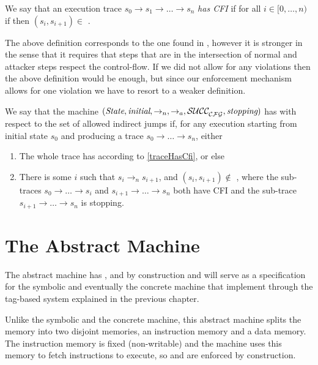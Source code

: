 \begin{definition}\label{traceHasCfi}
  We say that an execution trace $s_0 \to s_1 \to \ldots \to s_n$ {\em has CFI}
  if for all $ i \in [0,\ldots,n)$ if  then
  $(s_i,s_{i+1}) \in$ \SUCC .
\end{definition}


The above definition corresponds to the one found in \cite{AbadiBEL09}, however
it is stronger in the sense that it requires that steps that are in the
intersection of normal and attacker steps respect the control-flow. If we did
not allow for any violations then the above definition would be enough, but
since our enforcement mechanism allows for one violation we have to resort to a
weaker definition.

\begin{definition}[CFI]\label{cfi}
  We say that the machine
  $(\textit{State}, \textit{initial}, \to_n,\allowbreak \to_a, \mathcal{SUCC_\mathcal{CFG}^{}}, \textit{stopping})$
  has \CFI with respect to the set of allowed indirect jumps \CFG
  if, for any execution starting from initial state $s_0$
  and producing a trace $s_0 \to \ldots \to s_n$, either
  \begin{enumerate}
  \item The whole trace has \CFI according to
    \cref{traceHasCfi}, or else
  \item There is some $i$ such that $s_i \to_n s_{i+1}$,
  and $(s_i, s_{i+1}) \not \in$ \SUCC{}, where
  the sub-traces $s_0 \to \ldots \to s_i$ and
  $s_{i+1} \to \ldots \to s_n$ both have CFI
  and the sub-trace $s_{i+1} \to \ldots \to s_n$ is stopping.
  \end{enumerate}
\end{definition}

\section{The Abstract Machine}\label{sec:abstract_cfi}

The abstract machine has \CFI, \NXD and \NWC by construction and will
serve as a specification for the symbolic and eventually the concrete
machine that implement \CFI through the tag-based system explained in
the previous chapter.

Unlike the symbolic and the concrete machine, this abstract machine splits the
memory into two disjoint memories, an instruction memory and a data memory. The
instruction memory is fixed (non-writable) and the machine uses this memory to
fetch instructions to execute, so \NWC and \NXD are enforced by construction.

